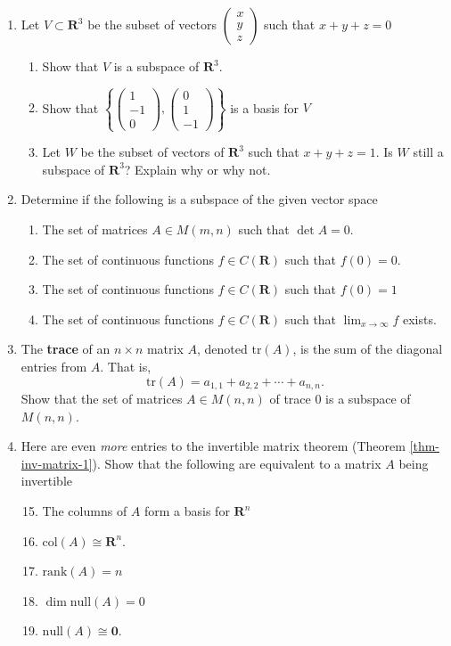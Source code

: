\documentclass[12pt]{article}
\numberwithin{equation}{subsection}
\numberwithin{figure}{subsection}
\theoremstyle{note}
\newcommand\tr[1]{\mathrm{tr}(#1)}
\newcommand\nul[1]{\mathrm{null}(#1)}
\newcommand\col[1]{\mathrm{col}(#1)}
\newcommand\rank[1]{\mathrm{rank}(#1)}
\begin{document}
\begin{enumerate}[label=\arabic*.]
\begin{enumerate}
	\end{enumerate}	
	\item Let $V\subset \mathbf{R}^3$ be the subset of vectors $\begin{pmatrix} x \\ y \\z\end{pmatrix}$ such that $x+y+z=0$
	\begin{enumerate}
		\item Show that $V$ is a subspace of $\mathbf{R}^3$.
		\item Show that $\left\{ \begin{pmatrix} 1 \\ -1 \\ 0 \end{pmatrix} , \begin{pmatrix} 0 \\ 1 \\ -1\end{pmatrix}\right\}$ is a basis for $V$
		\item Let $W$ be the subset of vectors of $\mathbf{R}^3$ such that $x+y+z=1$. Is $W$ still a subspace of $\mathbf{R}^3$? Explain why or why not. 	
	\end{enumerate}
	
	\item Determine if the following is a subspace of the given vector space
	
	\begin{enumerate}
		\item The set of matrices $A\in M(m,n)$ such that $\det A=0$.
		\item The set of continuous functions $f\in C(\mathbf{R})$ such that $f(0)=0$.
		\item The set of continuous functions $f\in C(\mathbf{R})$ such that $f(0)=1$
		\item The set of continuous functions $f\in C(\mathbf{R})$ such that $\lim_{x\to \infty} f$ exists.
	\end{enumerate}
	
	\item The \textbf{trace} of an $n\times n$ matrix $A$, denoted $\tr{A}$, is the sum of the diagonal entries from $A$. That is, \[ \tr{A}=a_{1,1}+a_{2,2}+\cdots+a_{n,n}.\]
		Show that the set of matrices $A\in M(n,n)$ of trace $0$ is a subspace of $M(n,n)$.
	
	\item  Here are even \textit{more} entries to the invertible matrix theorem (Theorem \ref{thm-inv-matrix-1}). Show that the following are equivalent to a matrix $A$ being invertible \begin{enumerate}\setcounter{enumii}{14}
		\item The columns of $A$ form a basis for $\mathbf{R}^n$
		\item $\col{A}\cong \mathbf{R}^n$.
		\item $\rank{A}=n$
		\item $\dim \nul{A}=0$
		\item $\nul{A}\cong \mathbf{0}$. 
	\end{enumerate}
	

\end{enumerate}
\end{document}
